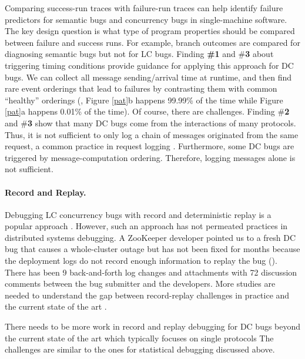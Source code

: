 Comparing success-run traces with failure-run traces can help identify
failure predictors for semantic bugs \cite{liblit03} 
and concurrency bugs \cite{cci.oopsla10}
in single-machine software.  The key
design question is what type of program properties should be
compared between failure and success runs. For example, branch
outcomes are compared for diagnosing semantic bugs but not for LC bugs.
%
%
Finding {\bf \#1} and \#{\bf 3} about triggering timing conditions
provide guidance for applying this approach for DC bugs. We can
collect all message sending/arrival time at runtime, and then find
rare event orderings that lead to failures by contrasting them with
common ``healthy'' orderings (\eg, Figure \ref{pat}b happens 99.99\%
of the time while Figure \ref{pat}a happens 0.01\% of the time).
%
%
Of course, there are challenges. Finding \#{\bf 2} and \#{\bf 3}
show that many DC bugs come from the interactions of
many protocols. Thus, it is not sufficient to only log a chain of messages
originated from the same request, a common practice in request logging
\cite{Chow+14-Mysterymachine}.  Furthermore, some DC bugs are triggered by
message-computation ordering. Therefore, logging messages alone is
not sufficient.

\paragraph{Record and Replay.}

Debugging LC concurrency bugs with record and deterministic replay is
a popular approach \cite{quickrec.isca13,
  doubleplay.asplos11}.  However, such an approach has not permeated
practices in distributed systems debugging.  A ZooKeeper developer
pointed us to a fresh DC bug that causes a whole-cluster outage but
has not been fixed for months because the deployment logs do not
record enough information to replay the bug ().  There has
been 9 back-and-forth log changes and attachments with 72 discussion
comments between the bug submitter and the developers.  More studies
are needed to understand the gap between record-replay challenges in
practice and the current state of the art \cite{Geels+06-Liblog,
  Liu+07-WiDS}.

There needs to be more work in record and replay debugging for DC bugs
beyond the current state of the art which typically focuses on single
protocols The challenges are similar to the ones for statistical
debugging discussed above.
\fi






